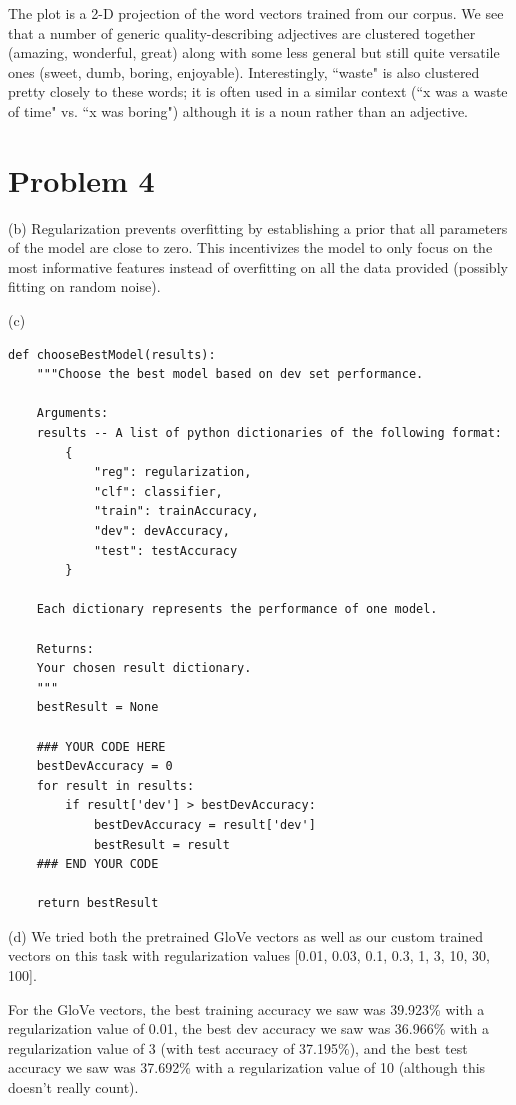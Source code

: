 \documentclass{article}
\begin{document}
The plot is a 2-D projection of the word vectors trained from our corpus. We see that a number of generic quality-describing adjectives are clustered together (amazing, wonderful, great) along with some less general but still quite versatile ones (sweet, dumb, boring, enjoyable). Interestingly, ``waste" is also clustered pretty closely to these words; it is often used in a similar context (``x was a waste of time" vs. ``x was boring") although it is a noun rather than an adjective.

\section{Problem 4}
(b) Regularization prevents overfitting by establishing a prior that all parameters of the model are close to zero. This incentivizes the model to only focus on the most informative features instead of overfitting on all the data provided (possibly fitting on random noise).

(c)
\begin{verbatim}
def chooseBestModel(results):
    """Choose the best model based on dev set performance.

    Arguments:
    results -- A list of python dictionaries of the following format:
        {
            "reg": regularization,
            "clf": classifier,
            "train": trainAccuracy,
            "dev": devAccuracy,
            "test": testAccuracy
        }

    Each dictionary represents the performance of one model.

    Returns:
    Your chosen result dictionary.
    """
    bestResult = None

    ### YOUR CODE HERE
    bestDevAccuracy = 0
    for result in results:
        if result['dev'] > bestDevAccuracy:
            bestDevAccuracy = result['dev']
            bestResult = result
    ### END YOUR CODE

    return bestResult
\end{verbatim}

(d) We tried both the pretrained GloVe vectors as well as our custom trained vectors on this task with regularization values [0.01, 0.03, 0.1, 0.3, 1, 3, 10, 30, 100]. 

For the GloVe vectors, the best training accuracy we saw was 39.923\% with a regularization value of 0.01, the best dev accuracy we saw was 36.966\% with a regularization value of 3 (with test accuracy of 37.195\%), and the best test accuracy we saw was 37.692\% with a regularization value of 10 (although this doesn't really count).
\end{document}

